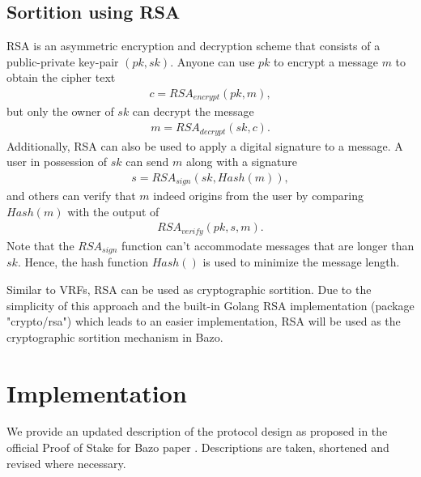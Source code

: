 \documentclass[12pt,a4]{article}
\begin{document}
\subsection{Sortition using RSA}

RSA is an asymmetric encryption and decryption scheme that consists of a public-private key-pair $(pk, sk)$. Anyone can use $pk$ to encrypt a message $m$ to obtain the cipher text
\begin{gather}
  c = RSA_{encrypt}(pk, m),
\end{gather}
but only the owner of $sk$ can decrypt the message
\begin{gather}
  m = RSA_{decrypt}(sk, c).
\end{gather}
Additionally, RSA can also be used to apply a digital signature to a message. A user in possession of $sk$ can send $m$ along with a signature
\begin{gather}
  s = RSA_{sign}(sk, Hash(m)),
\end{gather}
and others can verify that $m$ indeed origins from the user by comparing $Hash(m)$ with the output of
\begin{gather}
  RSA_{verify}(pk, s, m).
\end{gather}
Note that the $RSA_{sign}$ function can't accommodate messages that are longer than $sk$. Hence, the hash function $Hash()$ is used to minimize the message length.


Similar to VRFs, RSA can be used as cryptographic sortition. Due to the simplicity of this approach and the built-in Golang RSA implementation (package "crypto/rsa") which leads to an easier implementation, RSA will be used as the cryptographic sortition mechanism in Bazo.

\section{Implementation}

We provide an updated description of the protocol design as proposed in the official Proof of Stake for Bazo paper \cite{Bachmann18}. Descriptions are taken, shortened and revised where necessary.
\end{document}
